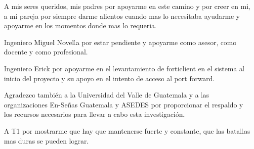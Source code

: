 A mis seres queridos, mis padres por apoyarme en este camino y por creer en mi, a mi pareja por siempre darme alientos cuando mas lo necesitaba ayudarme y apoyarme en los momentos donde mas lo requeria.

Ingeniero Miguel Novella por estar pendiente y apoyarme como asesor, como docente y como profesional.

Ingeniero Erick por apoyarme en el levantamiento de forticlient en el sistema al inicio del proyecto y su apoyo en el intento de acceso al port forward.

Agradezco también a la Universidad del Valle de Guatemala y a las organizaciones En-Señas Guatemala y ASEDES por proporcionar el respaldo y los recursos necesarios para llevar a cabo esta investigación.

A T1 por mostrarme que hay que mantenerse fuerte y constante, que las batallas mas duras se pueden lograr.